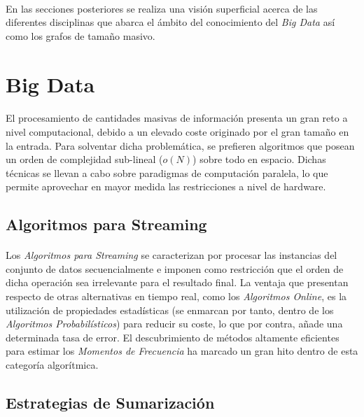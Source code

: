 \documentclass{subfiles}
\begin{document}
      \paragraph{}
      En las secciones posteriores se realiza una visión superficial acerca de las diferentes disciplinas que abarca el ámbito del conocimiento del \emph{Big Data} así como los grafos de tamaño masivo.

    \section{Big Data}
    \label{sec:introduction_big_data}

      \paragraph{}
      El procesamiento de cantidades masivas de información presenta un gran reto a nivel computacional, debido a un elevado coste originado por el gran tamaño en la entrada. Para solventar dicha problemática, se prefieren algoritmos que posean un orden de complejidad sub-lineal ($o(N)$) sobre todo en espacio. Dichas técnicas se llevan a cabo sobre paradigmas de computación paralela, lo que permite aprovechar en mayor medida las restricciones a nivel de hardware.

      \subsection{Algoritmos para Streaming}

        \paragraph{}
        Los \emph{Algoritmos para Streaming} se caracterizan por procesar las instancias del conjunto de datos secuencialmente e imponen como restricción que el orden de dicha operación sea irrelevante para el resultado final. La ventaja que presentan respecto de otras alternativas en tiempo real, como los \emph{Algoritmos Online}, es la utilización de propiedades estadísticas (se enmarcan por tanto, dentro de los \emph{Algoritmos Probabilísticos}) para reducir su coste, lo que por contra, añade una determinada tasa de error. El descubrimiento de métodos altamente eficientes para estimar los \emph{Momentos de Frecuencia} ha marcado un gran hito dentro de esta categoría algorítmica.

      \subsection{Estrategias de Sumarización}
\end{document}
